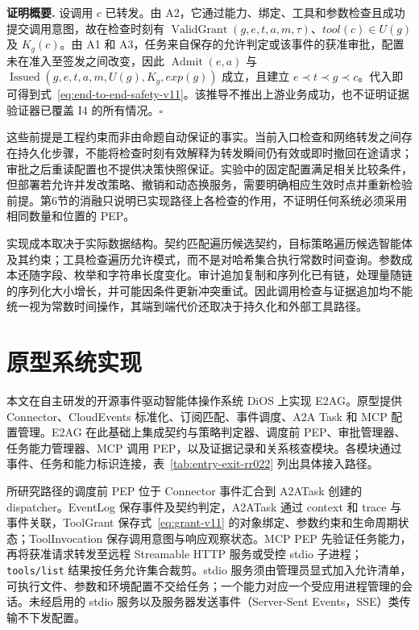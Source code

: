 \noindent\textbf{证明概要.}
设调用 $c$ 已转发。由 A2，它通过能力、绑定、工具和参数检查且成功提交调用意图，故在检查时刻有 $\operatorname{ValidGrant}(g,e,t,a,m,\tau)$、$tool(c)\in U(g)$ 及 $K_g(c)$。由 A1 和 A3，任务来自保存的允许判定或该事件的获准审批，配置未在准入至签发之间改变，因此 $\operatorname{Admit}(e,a)$ 与 $\operatorname{Issued}(g,e,t,a,m,U(g),K_g,exp(g))$ 成立，且建立 $e\prec t\prec g\prec c$。代入即可得到式~\eqref{eq:end-to-end-safety-v11}。该推导不推出上游业务成功，也不证明证据验证器已覆盖 I4 的所有情况。\hfill$\square$

这些前提是工程约束而非由命题自动保证的事实。当前入口检查和网络转发之间存在持久化步骤，不能将检查时刻有效解释为转发瞬间仍有效或即时撤回在途请求；审批之后重读配置也不提供决策快照保证。实验中的固定配置满足相关比较条件，但部署若允许并发改策略、撤销和动态换服务，需要明确相应生效时点并重新检验前提。第6节的消融只说明已实现路径上各检查的作用，不证明任何系统必须采用相同数量和位置的 PEP。

实现成本取决于实际数据结构。契约匹配遍历候选契约，目标策略遍历候选智能体及其约束；工具检查遍历允许模式，而不是对哈希集合执行常数时间查询。参数成本还随字段、枚举和字符串长度变化。审计追加复制和序列化已有链，处理量随链的序列化大小增长，并可能因条件更新冲突重试。因此调用检查与证据追加均不能统一视为常数时间操作，其端到端代价还取决于持久化和外部工具路径。

\section{原型系统实现}\label{sec:implementation-v11}

本文在自主研发的开源事件驱动智能体操作系统 DiOS 上实现 E2AG。原型提供 Connector、CloudEvents 标准化、订阅匹配、事件调度、A2A Task 和 MCP 配置管理。E2AG 在此基础上集成契约与策略判定器、调度前 PEP、审批管理器、任务能力管理器、MCP 调用 PEP，以及证据记录和关系核查模块。各模块通过事件、任务和能力标识连接，表~\ref{tab:entry-exit-rr022} 列出具体接入路径。

所研究路径的调度前 PEP 位于 Connector 事件汇合到 A2ATask 创建的 dispatcher。EventLog 保存事件及契约判定，A2ATask 通过 context 和 trace 与事件关联，ToolGrant 保存式~\eqref{eq:grant-v11} 的对象绑定、参数约束和生命周期状态；ToolInvocation 保存调用意图与响应观察状态。MCP PEP 先验证任务能力，再将获准请求转发至远程 Streamable HTTP 服务或受控 stdio 子进程；\texttt{tools/list} 结果按任务允许集合裁剪。stdio 服务须由管理员显式加入允许清单，可执行文件、参数和环境配置不交给任务；一个能力对应一个受应用进程管理的会话。未经启用的 stdio 服务以及服务器发送事件（Server-Sent Events，SSE）类传输不下发配置。

